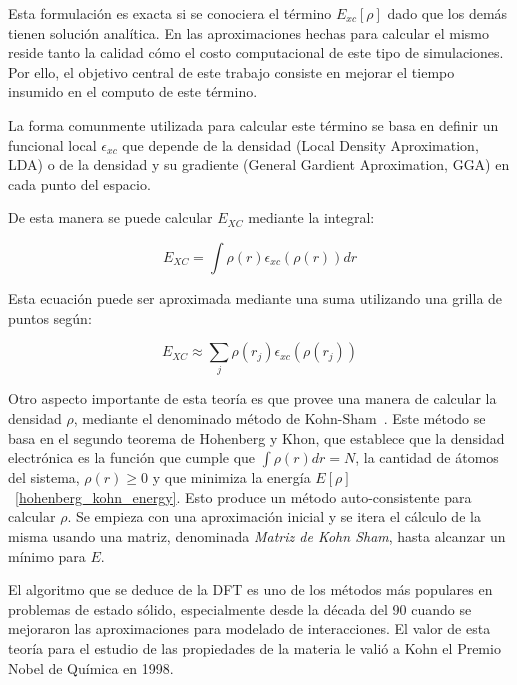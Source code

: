 Esta formulaci\'on es exacta si se conociera el t\'ermino $E_{xc}[\rho]$ dado que los dem\'as tienen soluci\'on anal\'itica. En las aproximaciones hechas para calcular el mismo reside tanto la calidad c\'omo el costo
computacional de este tipo de simulaciones. Por ello, el objetivo central de este trabajo consiste en mejorar el tiempo insumido en el computo de este t\'ermino.

La forma comunmente utilizada para calcular este t\'ermino se basa en definir un funcional local $\epsilon_{xc}$ que depende de la densidad (Local Density Aproximation, LDA) o de la densidad y su gradiente
(General Gardient Aproximation, GGA) en cada punto del espacio.

De esta manera se puede calcular $E_{XC}$  mediante la integral:

\begin{equation}
    E_{XC} = \int \rho(r) \epsilon_{xc}\left( \rho(r) \right ) dr
\end{equation}

Esta ecuaci\'on puede ser aproximada mediante una suma utilizando una grilla de puntos seg\'un:

\begin{equation}
    \label{approx_excenergy}
    E_{XC} \approx \sum_j \rho(r_j) \epsilon_{xc} (\rho(r_j))
\end{equation}

Otro aspecto importante de esta teor\'ia es que provee una manera de calcular la densidad $\rho$, mediante el denominado m\'etodo de Kohn-Sham~\cite{KohnSham}. 
Este m\'etodo se basa en el segundo teorema de Hohenberg y Khon, que establece que la densidad electr\'onica es la funci\'on que cumple que $\int \rho(r) dr = N$, la cantidad de \'atomos del sistema, $\rho(r) \geq 0$ y que minimiza la energ\'ia $E[\rho]$~\ref{hohenberg_kohn_energy}. 
Esto produce un m\'etodo auto-consistente para calcular $\rho$. Se empieza con una aproximaci\'on inicial y se itera el c\'alculo de la misma usando una matriz, denominada \textit{Matriz de Kohn Sham}, hasta alcanzar un m\'inimo para $E$.

El algoritmo que se deduce de la DFT es uno de los m\'etodos m\'as populares en problemas de estado s\'olido, especialmente desde la d\'ecada del 90 cuando se mejoraron las aproximaciones para modelado de interacciones. 
El valor de esta teor\'ia para el estudio de las propiedades de la materia le vali\'o a Kohn el Premio Nobel de Qu\'imica en 1998.

